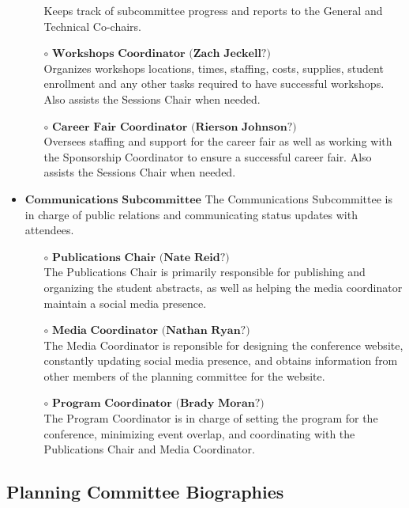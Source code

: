 \begin{itemize}
\begin{itemize}
		Keeps track of subcommittee progress and reports to the General and Technical Co-chairs.
		\item[$\circ$] $\textbf{Workshops Coordinator (Zach Jeckell?)}$\\
		Organizes workshops locations, times, staffing, costs, supplies, student enrollment
		and any other tasks required to have successful workshops. Also assists the Sessions Chair when needed.
		\item[$\circ$] $\textbf{Career Fair Coordinator (Rierson Johnson?)}$\\
		Oversees staffing and support for the career fair as well as working with the Sponsorship
		Coordinator to ensure a successful career fair. Also assists the Sessions Chair when needed.
	\end{itemize}
	\item $\textbf{Communications Subcommittee}$
	The Communications Subcommittee is in charge of public relations and communicating status updates with attendees.
	\begin{itemize}
		\item[$\circ$] $\textbf{Publications Chair (Nate Reid?)}$\\
		The Publications Chair is primarily responsible for publishing and organizing the student abstracts, as well as 
		helping the media coordinator maintain a social media presence. 
		\item[$\circ$] $\textbf{Media Coordinator (Nathan Ryan?)}$\\
		The Media Coordinator is reponsible for designing the conference website, constantly updating social media presence,
		and obtains information from other members of the planning committee for the website. 
		\item[$\circ$] $\textbf{Program Coordinator (Brady Moran?)}$\\
		The Program Coordinator is in charge of setting the program for the conference, minimizing event overlap, and coordinating
		with the Publications Chair and Media Coordinator.
	\end{itemize}
\end{itemize}

\newpage
\subsection{Planning Committee Biographies}

